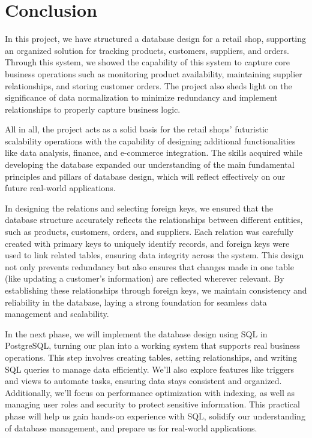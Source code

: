 \section{Conclusion}

In this project, we have structured a database design for a retail shop, supporting an organized solution for tracking products, customers, suppliers, and orders. Through this system, we showed the capability of this system to capture core business operations such as monitoring product availability, maintaining supplier relationships, and storing customer orders. The project also sheds light on the significance of data normalization to minimize redundancy and implement relationships to properly capture business logic.

All in all, the project acts as a solid basis for the retail shops' futuristic scalability operations with the capability of designing additional functionalities like data analysis, finance, and e-commerce integration. The skills acquired while developing the database expanded our understanding of the main fundamental principles and pillars of database design, which will reflect effectively on our future real-world applications.

In designing the relations and selecting foreign keys, we ensured that the database structure accurately reflects the relationships between different entities, such as products, customers, orders, and suppliers. Each relation was carefully created with primary keys to uniquely identify records, and foreign keys were used to link related tables, ensuring data integrity across the system. This design not only prevents redundancy but also ensures that changes made in one table (like updating a customer's information) are reflected wherever relevant. By establishing these relationships through foreign keys, we maintain consistency and reliability in the database, laying a strong foundation for seamless data management and scalability.

In the next phase, we will implement the database design using SQL in PostgreSQL, turning our plan into a working system that supports real business operations. This step involves creating tables, setting relationships, and writing SQL queries to manage data efficiently. We'll also explore features like triggers and views to automate tasks, ensuring data stays consistent and organized. Additionally, we'll focus on performance optimization with indexing, as well as managing user roles and security to protect sensitive information. This practical phase will help us gain hands-on experience with SQL, solidify our understanding of database management, and prepare us for real-world applications.
